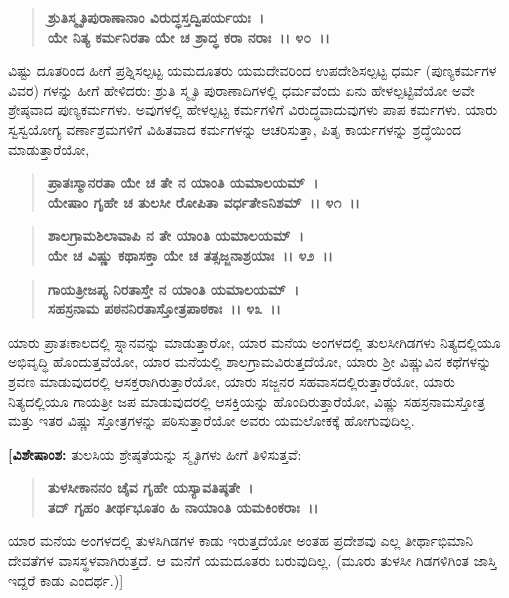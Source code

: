\begin{verse}
\textbf{ಶ್ರುತಿಸ್ಮೃತಿಪುರಾಣಾನಾಂ ವಿರುದ್ಧಸ್ತದ್ವಿಪರ್ಯಯಃ~।}\\\textbf{ಯೇ ನಿತ್ಯ ಕರ್ಮನಿರತಾ ಯೇ ಚ ಶ್ರಾದ್ಧ ಕರಾ ನರಾಃ~।। ೪೦~।।}
\end{verse}

ವಿಷ್ಟು ದೂತರಿಂದ ಹೀಗೆ ಪ್ರಶ್ನಿಸಲ್ಪಟ್ಟ ಯಮದೂತರು ಯಮದೇವರಿಂದ ಉಪದೇಶಿಸಲ್ಪಟ್ಟ ಧರ್ಮ (ಪುಣ್ಯಕರ್ಮಗಳ ವಿವರ) ಗಳನ್ನು ಹೀಗೆ ಹೇಳಿದರು: ಶ್ರುತಿ ಸ್ಮೃತಿ ಪುರಾಣಾದಿಗಳಲ್ಲಿ ಧರ್ಮವೆಂದು ಏನು ಹೇಳಲ್ಪಟ್ಟಿವೆಯೋ ಅವೇ ಶ್ರೇಷ್ಠವಾದ ಪುಣ್ಯಕರ್ಮಗಳು. ಅವುಗಳಲ್ಲಿ ಹೇಳಲ್ಪಟ್ಟ ಕರ್ಮಗಳಿಗೆ ವಿರುದ್ಧವಾದುವುಗಳು ಪಾಪ ಕರ್ಮಗಳು. ಯಾರು ಸ್ವಸ್ವಯೋಗ್ಯ ವರ್ಣಾಶ್ರಮಗಳಿಗೆ ವಿಹಿತವಾದ ಕರ್ಮಗಳನ್ನು ಆಚರಿಸುತ್ತಾ, ಪಿತೃ ಕಾರ್ಯಗಳನ್ನು ಶ್ರದ್ಧೆಯಿಂದ ಮಾಡುತ್ತಾರೆಯೋ,

\begin{verse}
\textbf{ಪ್ರಾತಃಸ್ಮಾನರತಾ ಯೇ ಚ ತೇ ನ ಯಾಂತಿ ಯಮಾಲಯಮ್~।}\\\textbf{ಯೇಷಾಂ ಗೃಹೇ ಚ ತುಲಸೀ ರೋಪಿತಾ ವರ್ಧತೇಽನಿಶಮ್~।। ೪೧~।। }
\end{verse}

\begin{verse}
\textbf{ಶಾಲಗ್ರಾಮಶಿಲಾವಾಪಿ ನ ತೇ ಯಾಂತಿ ಯಮಾಲಯಮ್~।}\\\textbf{ಯೇ ಚ ವಿಷ್ಣು ಕಥಾಸಕ್ತಾ ಯೇ ಚ ತತ್ಸಜ್ಜನಾಶ್ರಯಾಃ~।। ೪೨~।।}
\end{verse}

\begin{verse}
\textbf{ಗಾಯತ್ರೀಜಪ್ಯ ನಿರತಾಸ್ತೇ ನ ಯಾಂತಿ ಯಮಾಲಯಮ್~।}\\\textbf{ಸಹಸ್ರನಾಮ ಪಠನನಿರತಾಸ್ತೋತ್ರಪಾಠಕಾಃ~।। ೪೩~।।}
\end{verse}

ಯಾರು ಪ್ರಾತಃಕಾಲದಲ್ಲಿ ಸ್ನಾನವನ್ನು ಮಾಡುತ್ತಾರೋ, ಯಾರ ಮನೆಯ ಅಂಗಳದಲ್ಲಿ ತುಲಸೀಗಿಡಗಳು ನಿತ್ಯದಲ್ಲಿಯೂ ಅಭಿವೃದ್ಧಿ ಹೊಂದುತ್ತವೆಯೋ, ಯಾರ ಮನೆಯಲ್ಲಿ ಶಾಲಗ್ರಾಮವಿರುತ್ತದೆಯೋ, ಯಾರು ಶ‍್ರೀ ವಿಷ್ಣುವಿನ ಕಥೆಗಳನ್ನು ಶ್ರವಣ ಮಾಡುವುದರಲ್ಲಿ ಆಸಕ್ತರಾಗಿರುತ್ತಾರೆಯೋ, ಯಾರು ಸಜ್ಜನರ ಸಹವಾಸದಲ್ಲಿರುತ್ತಾರೆಯೋ, ಯಾರು ನಿತ್ಯದಲ್ಲಿಯೂ ಗಾಯತ್ರೀ ಜಪ ಮಾಡುವುದರಲ್ಲಿ ಆಸಕ್ತಿಯನ್ನು ಹೊಂದಿರುತ್ತಾರೆಯೋ, ವಿಷ್ಣು ಸಹಸ್ರನಾಮಸ್ತೋತ್ರ ಮತ್ತು ಇತರ ವಿಷ್ಣು ಸ್ತೋತ್ರಗಳನ್ನು ಪಠಿಸುತ್ತಾರೆಯೋ ಅವರು ಯಮಲೋಕಕ್ಕೆ ಹೋಗುವುದಿಲ್ಲ.

\textbf{[ವಿಶೇಷಾಂಶ:} ತುಲಸಿಯ ಶ್ರೇಷ್ಠತೆಯನ್ನು ಸ್ಮೃತಿಗಳು ಹೀಗೆ ತಿಳಿಸುತ್ತವೆ:

\begin{verse}
\textbf{ತುಳಸೀಕಾನನಂ ಚೈವ ಗೃಹೇ ಯಸ್ಯಾವತಿಷ್ಠತೇ~।}\\\textbf{ತದ್ ಗೃಹಂ ತೀರ್ಥಭೂತಂ ಹಿ ನಾಯಾಂತಿ ಯಮಕಿಂಕರಾಃ~।।}
\end{verse}

ಯಾರ ಮನೆಯ ಅಂಗಳದಲ್ಲಿ ತುಳಸಿಗಿಡಗಳ ಕಾಡು ಇರುತ್ತದೆಯೋ ಅಂತಹ ಪ್ರದೇಶವು ಎಲ್ಲ ತೀರ್ಥಾಭಿಮಾನಿ ದೇವತೆಗಳ ವಾಸಸ್ಥಳವಾಗಿರುತ್ತದೆ. ಆ ಮನೆಗೆ ಯಮದೂತರು ಬರುವುದಿಲ್ಲ. (ಮೂರು ತುಳಸೀ ಗಿಡಗಳಿಗಿಂತ ಜಾಸ್ತಿ ಇದ್ದರೆ ಕಾಡು ಎಂದರ್ಥ.)]

